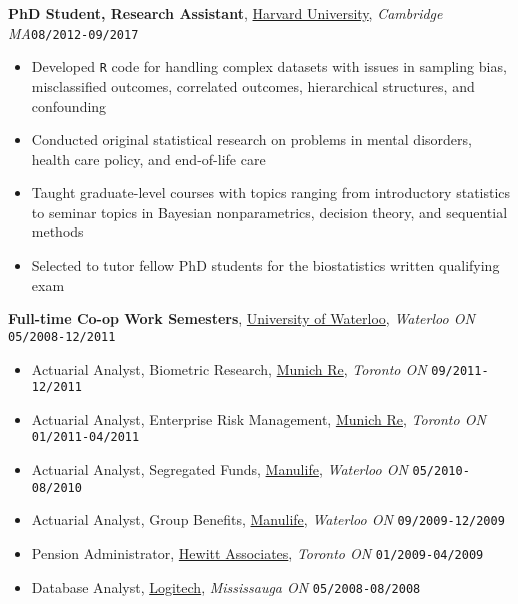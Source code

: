 \documentclass[10pt,english]{article}
\begin{document}
\vspace{2mm}

\textbf{PhD Student, Research Assistant}, \textcolor{blue}{\href{https://gsas.harvard.edu/programs-of-study/all/biostatistics}{Harvard University}}, \textit{Cambridge
MA}\hfill \texttt{08/2012-09/2017}
\begin{itemize}
\item Developed \texttt{R} code for handling complex datasets with issues in sampling bias, misclassified outcomes, correlated outcomes, hierarchical structures, and confounding
\item Conducted original statistical research on problems in mental disorders, health care policy, and end-of-life care
\item Taught graduate-level courses with topics ranging from introductory statistics to seminar topics in Bayesian nonparametrics, decision theory, and sequential methods
\item Selected to tutor fellow PhD students for the biostatistics written qualifying exam
\end{itemize}

\vspace{2mm}

\textbf{Full-time Co-op Work Semesters}, \textcolor{blue}{\href{https://uwaterloo.ca/math/}{University of Waterloo}}, \textit{Waterloo ON} \hfill \texttt{05/2008-12/2011}
\begin{itemize}
\item Actuarial Analyst, Biometric Research, \textcolor{blue}{\href{https://www.munichre.com/ca}{Munich Re}}, \textit{Toronto ON} \hfill \texttt{09/2011-12/2011}
\item Actuarial Analyst, Enterprise Risk Management, \textcolor{blue}{\href{https://www.munichre.com/ca}{Munich Re}}, \textit{Toronto ON} \hfill \texttt{01/2011-04/2011}
\item Actuarial Analyst, Segregated Funds, \textcolor{blue}{\href{https://www.manulife.ca}{Manulife}}, \textit{Waterloo ON} \hfill \texttt{05/2010-08/2010}
\item Actuarial Analyst, Group Benefits, \textcolor{blue}{\href{https://www.manulife.ca}{Manulife}}, \textit{Waterloo ON} \hfill \texttt{09/2009-12/2009}
\item Pension Administrator, \textcolor{blue}{\href{http://www.aonhewitt.com}{Hewitt Associates}}, \textit{Toronto ON} \hfill \texttt{01/2009-04/2009}
\item Database Analyst, \textcolor{blue}{\href{https://www.logitech.com/en-ca}{Logitech}}, \textit{Mississauga ON} \hfill \texttt{05/2008-08/2008}
\end{itemize}
\end{document}

